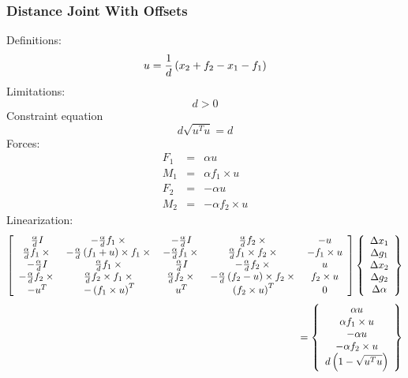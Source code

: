\documentclass[10pt,dvips]{report}
\begin{document}
\subsubsection{Distance Joint With Offsets}
Definitions:
\begin{displaymath}
	u = \frac{1}{d}\plbr{x_2 + f_2 - x_1 - f_1}
\end{displaymath}
Limitations:
\begin{displaymath}
	d > 0
\end{displaymath}
Constraint equation 
\begin{displaymath}
	d \sqrt{u^T u} = d
\end{displaymath}
Forces:
\begin{eqnarray*}
	F_1 & = & \alpha u \\
	M_1 & = & \alpha f_1 \times u \\
	F_2 & = & -\alpha u \\
	M_2 & = & -\alpha f_2 \times u
\end{eqnarray*}
Linearization:
\begin{displaymath}
	\sqbr{\matr{ccccc}{
		\frac{\alpha}{d}I & -\frac{\alpha}{d}f_1\times{} &
			-\frac{\alpha}{d}I & \frac{\alpha}{d}f_2\times{} & -u \\
		\frac{\alpha}{d}f_1\times{} & 
			-\frac{\alpha}{d}\plbr{f_1 + u}\times{f_1\times{}} &
			-\frac{\alpha}{d}f_1\times{} & 
			\frac{\alpha}{d}f_1\times{f_2\times{}} & 
			-f_1\times{u} \\
		-\frac{\alpha}{d}I & \frac{\alpha}{d}f_1\times{} &
			\frac{\alpha}{d}I & -\frac{\alpha}{d}f_2\times{} & u \\
		-\frac{\alpha}{d}f_2\times{} &
			\frac{\alpha}{d}f_2\times{f_1\times{}} &
			\frac{\alpha}{d}f_2\times{} &
			- \frac{\alpha}{d}\plbr{f_2 - u}\times{f_2\times{}} &
			f_2\times{u} \\
		-u^T & - \plbr{f_1\times{u}}^T & 
			u^T & \plbr{f_2\times{u}}^T & 0
	}}\cubr{\cvvect{
		\Delta{x_1} \\
		\Delta{g_1} \\
		\Delta{x_2} \\
		\Delta{g_2} \\
		\Delta{\alpha}
	}}
\end{displaymath}
\begin{displaymath}
	\mbox{\hspace{100mm}} = \cubr{\cvvect{
		\alpha u \\
		\alpha f_1\times{u} \\
		-\alpha u \\
		-\alpha f_2\times{u} \\
		d\plbr{1 - \sqrt{u^T u}}
	}}
\end{displaymath}
\end{document}
